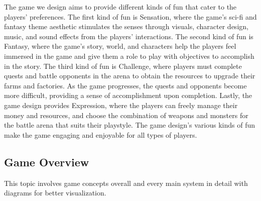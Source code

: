 \documentclass[12pt,oneside,openright,a4paper]{cpe-english-project}
\begin{document}
%
\hspace{2em}The game we design aims to provide different kinds of fun that cater to the players' preferences. The first kind of fun is Sensation, where the game's sci-fi and fantasy theme aesthetic stimulates the senses through visuals, character design, music, and sound effects from the players' interactions. The second kind of fun is Fantasy, where the game's story, world, and characters help the players feel immersed in the game and give them a role to play with objectives to accomplish in the story. The third kind of fun is Challenge, where players must complete quests and battle opponents in the arena to obtain the resources to upgrade their farms and factories. As the game progresses, the quests and opponents become more difficult, providing a sense of accomplishment upon completion. Lastly, the game design provides Expression, where the players can freely manage their money and resources, and choose the combination of weapons and monsters for the battle arena that suits their playstyle. The game design's various kinds of fun make the game engaging and enjoyable for all types of players.

\subsection{Game Overview}
This topic involves game concepts overall and every main system in detail with diagrams for better visualization.
\end{document}

